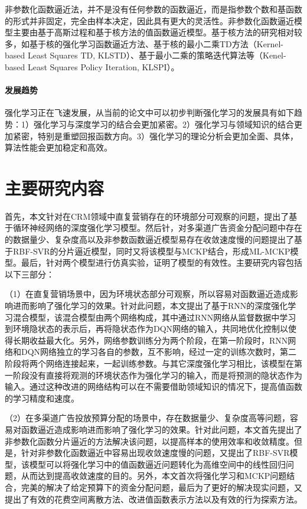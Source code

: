 非参数化函数逼近法，并不是没有任何参数的函数逼近，而是指参数个数和基函数的形式并非固定，完全由样本决定，因此具有更大的灵活性。非参数化函数逼近模型主要由基于高斯过程和基于核方法的值函数逼近模型。基于核方法的研究相对较多，如基于核的强化学习函数逼近方法\citep{ormoneit2002kernel}、基于核的最小二乘TD方法（Kernel-based Least Squares TD, KLSTD）\citep{xu2005kernel}、基于最小二乘的策略迭代算法等（Kenel-based Least Squares Policy Iteration, KLSPI）\citep{xu2007kernel}。

\paragraph{发展趋势}
强化学习正在飞速发展，从当前的论文中可以初步判断强化学习的发展具有如下趋势：1）强化学习与深度学习的结合会更加紧密。2）强化学习与领域知识的结合更加紧密，特别是重塑回报函数方向。3）强化学习的理论分析会更加全面、具体，算法性能会更加稳定和高效。

\section{主要研究内容}
首先，本文针对在CRM领域中直复营销存在的环境部分可观察的问题，提出了基于循环神经网络的深度强化学习模型。然后针，对多渠道广告资金分配问题中存在的数据量少、复杂度高以及非参数函数逼近模型易存在收敛速度慢的问题提出了基于RBF-SVR的分片逼近模型，同时又将该模型与MCKP结合，形成ML-MCKP模型。最后，针对两个模型进行仿真实验，证明了模型的有效性。主要研究内容包括以下三部分：

（1）在直复营销场景中，因为环境状态部分可观察，所以容易对函数逼近造成影响进而影响了强化学习的效果。针对此问题，本文提出了基于RNN的深度强化学习混合模型，该混合模型由两个网络构成，其中通过RNN网络从监督数据中学习到环境隐状态的表示后，再将隐状态作为DQN网络的输入，共同地优化控制以使得长期收益最大化。另外，网络参数训练分为两个阶段，在第一阶段时，RNN网络和DQN网络独立的学习各自的参数，互不影响，经过一定的训练次数时，第二阶段将两个网络连接起来，一起训练参数。与其它深度强化学习相比，该模型在第一阶段没有直接将观测的环境状态作为强化学习的输入，而是将预测的隐状态作为输入。通过这种改进的网络结构可以在不需要借助领域知识的情况下，提高值函数的学习精度和速度。

（2）在多渠道广告投放预算分配的场景中，存在数据量少、复杂度高等问题，容易对函数逼近造成影响进而影响了强化学习的效果。针对此问题，本文首先提出了非参数化函数分片逼近的方法解决该问题，以提高样本的使用效率和收敛精度。但是，针对非参数化函数逼近中容易出现收敛速度慢的问题，又提出了RBF-SVR模型，该模型可以将强化学习中的值函数逼近问题转化为高维空间中的线性回归问题，从而达到提高收敛速度的目的。另外，本文首次将强化学习和MCKP问题结合，完美的解决了给定预算下的资金分配问题，最后为了更好的解决现实问题，又提出了有效的花费空间离散方法、改进值函数表示方法以及有效的行为探索方法。

